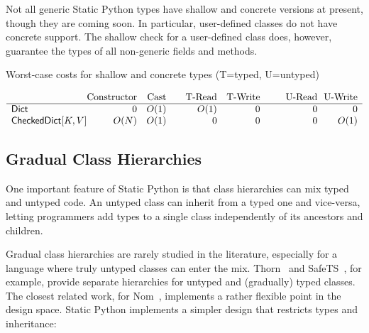 \documentclass[english,cleveref,submission]{programming}
\newcommand{\SP}{Static Python}
\newcommand{\typefont}[1]{\mathsf{#1}}
\newcommand{\paramtype}[2]{#1[#2]}
\newcommand{\sptrawpydict}{\typefont{Dict}}
\newcommand{\sptrawchkdict}{\typefont{CheckedDict}} %
\newcommand{\sptchkdict}[2]{\paramtype{\sptrawchkdict}{#1, #2}}
\begin{document}
Not all generic \SP{} types have shallow and concrete versions at present,
though they are coming soon.
In particular, user-defined classes do not have concrete support.
The shallow check for a user-defined class does, however, guarantee the types
of all non-generic fields and methods.

\begin{table}[t]
  \caption{Worst-case costs for shallow and concrete types (T=typed, U=untyped)}
  \label{t:shallow-vs-concrete}

  \centering
  \(\begin{array}{l@{}rr@{\qquad}rr@{~~}@{\qquad}r@{~~}r}
                   & \mbox{Constructor} & \mbox{Cast} & \mbox{T-Read} & \mbox{T-Write} & \mbox{U-Read} & \mbox{U-Write} \\\hline
    \sptrawpydict         &           0 &        O(1) &          O(1) &              0 &             0 &              0 \\
    \sptchkdict{K}{V}     &        O(N) &        O(1) &             0 &              0 &             0 &           O(1)
  \end{array}\)
\end{table}



\subsection{Gradual Class Hierarchies}
\label{s:inheritance}

One important feature of \SP{} is that class hierarchies can
mix typed and untyped code.
An untyped class can inherit from a typed one and vice-versa,
letting programmers add types to a single class independently of its ancestors
and children.


Gradual class hierarchies are rarely studied in the literature, especially
for a language where truly untyped classes can enter the mix.
Thorn~\cite{wzlov-popl-2010} and SafeTS~\cite{rsfbv-popl-2015}, for example,
provide separate hierarchies for untyped and (gradually) typed classes.
The closest related work, for Nom~\cite{mt-oopsla-2017}, implements
a rather flexible point in the design space.
\SP{} implements a simpler design that restricts types and
inheritance:
\end{document}
